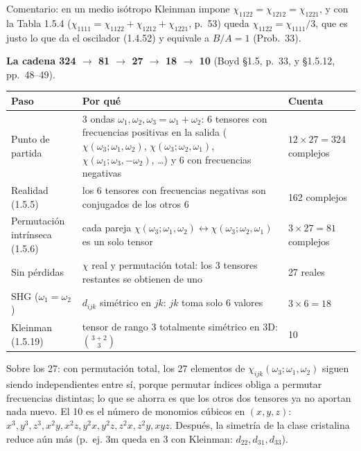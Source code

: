 Comentario: en un medio isótropo Kleinman impone $\chi_{1122}=\chi_{1212}=\chi_{1221}$, y con la Tabla 1.5.4 ($\chi_{1111}=\chi_{1122}+\chi_{1212}+\chi_{1221}$,
p.~53) queda $\chi_{1122}=\chi_{1111}/3$, que es justo lo que da el oscilador (1.4.52) y equivale a $B/A=1$ (Prob.~33).

 \textbf{La cadena 324 $\to$ 81 $\to$ 27 $\to$ 18 $\to$ 10} (Boyd §1.5, p.~33, y §1.5.12, pp.~48–49).
\begin{center}
\begin{tabular}{@{}p{3.3cm}p{9.2cm}p{2.8cm}@{}}\toprule
Paso & Por qué & Cuenta \\\midrule
Punto de partida & 3 ondas $\omega_1,\omega_2,\omega_3=\omega_1+\omega_2$: 6 tensores con frecuencias positivas en la salida
($\chi(\omega_3;\omega_1,\omega_2)$, $\chi(\omega_3;\omega_2,\omega_1)$, $\chi(\omega_1;\omega_3,-\omega_2)$, \dots) y 6 con frecuencias negativas & $12\times27=324$ complejos\\
Realidad (1.5.5) & los 6 tensores con frecuencias negativas son conjugados de los otros 6 & 162 complejos\\
Permutación intrínseca (1.5.6) & cada pareja $\chi(\omega_3;\omega_1,\omega_2)\leftrightarrow\chi(\omega_3;\omega_2,\omega_1)$ es un solo tensor & $3\times27=81$ complejos\\
Sin pérdidas & $\chi$ real y permutación total: los 3 tensores restantes se obtienen de uno & 27 reales\\
SHG ($\omega_1=\omega_2$) & $d_{ijk}$ simétrico en $jk$: $jk$ toma solo 6 valores & $3\times6=18$\\
Kleinman (1.5.19) & tensor de rango 3 totalmente simétrico en 3D: $\binom{3+2}{3}$ & 10\\\bottomrule
\end{tabular}
\end{center}
Sobre los 27: con permutación total, los 27 elementos de $\chi_{ijk}(\omega_3;\omega_1,\omega_2)$ siguen siendo independientes entre sí,
porque permutar índices obliga a permutar frecuencias distintas; lo que se ahorra es que los otros dos tensores ya no aportan nada nuevo.
El 10 es el número de monomios cúbicos en $(x,y,z)$: $x^3,y^3,z^3,x^2y,x^2z,y^2x,y^2z,z^2x,z^2y,xyz$.
Después, la simetría de la clase cristalina reduce aún más (p.~ej. 3m queda en 3 con Kleinman: $d_{22},d_{31},d_{33}$).

